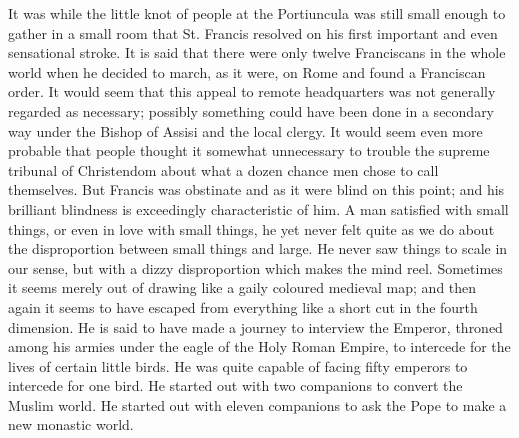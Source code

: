 \documentclass{book}
\begin{document}
It was while the little knot of people at the Portiuncula was still small enough to gather in a small room that St. Francis resolved on his first important and even sensational stroke. It is said that there were only twelve Franciscans in the whole world when he decided to march, as it were, on Rome and found a Franciscan order. It would seem that this appeal to remote headquarters was not generally regarded as necessary; possibly something could have been done in a secondary way under the Bishop of Assisi and the local clergy. It would seem even more probable that people thought it somewhat unnecessary to trouble the supreme tribunal of Christendom about what a dozen chance men chose to call themselves. But Francis was obstinate and as it were blind on this point; and his brilliant blindness is exceedingly characteristic of him. A man satisfied with small things, or even in love with small things, he yet never felt quite as we do about the disproportion between small things and large. He never saw things to scale in our sense, but with a dizzy disproportion which makes the mind reel. Sometimes it seems merely out of drawing like a gaily coloured medieval map; and then again it seems to have escaped from everything like a short cut in the fourth dimension. He is said to have made a journey to interview the Emperor, throned among his armies under the eagle of the Holy Roman Empire, to intercede for the lives of certain little birds. He was quite capable of facing fifty emperors to intercede for one bird. He started out with two companions to convert the Muslim world. He started out with eleven companions to ask the Pope to make a new monastic world.
\end{document}
